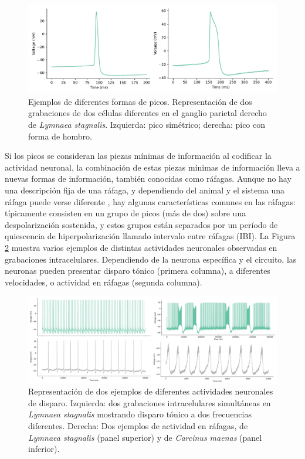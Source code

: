 \begin{figure}[htb!]
	\centering
	\includegraphics[width=\linewidth]{img/intro/spike-types.pdf}
	\caption{Ejemplos de diferentes formas de picos. Representación de dos grabaciones de dos células diferentes en el ganglio parietal derecho de \textit{Lymnaea stagnalis}. Izquierda: pico simétrico; derecha: pico con forma de hombro.}
	\label{fig:spike-types spanish}
\end{figure}

Si los picos se consideran las piezas mínimas de información al codificar la actividad neuronal, la combinación de estas piezas mínimas de información lleva a nuevas formas de información, también conocidas como ráfagas. Aunque no hay una descripción fija de una ráfaga, y dependiendo del animal y el sistema una ráfaga puede verse diferente \parencite{russell_bursting_1978,palmu_detection_2010,lundqvist_gamma_2016}, hay algunas características comunes en las ráfagas: típicamente consisten en un grupo de picos (más de dos) sobre una despolarización sostenida, y estos grupos están separados por un período de quiescencia de hiperpolarización llamado intervalo entre ráfagas (IBI). La Figura \ref{fig:spike_activity-types spanish} muestra varios ejemplos de distintas actividades neuronales observadas en grabaciones intracelulares. Dependiendo de la neurona específica y el circuito, las neuronas pueden presentar disparo tónico (primera columna), a diferentes velocidades, o actividad en ráfagas (segunda columna).

\begin{figure}[htb!]
	\centering
	\includegraphics[width=\linewidth]{img/intro/spike_activity-types.pdf}
	\caption{Representación de dos ejemplos de diferentes actividades neuronales de disparo. Izquierda: dos grabaciones intracelulares simultáneas en \textit{Lymnaea stagnalis} mostrando disparo tónico a dos frecuencias diferentes. Derecha: Dos ejemplos de actividad en ráfagas, de \textit{Lymnaea stagnalis} (panel superior) y de \textit{Carcinus maenas} (panel inferior).}
	\label{fig:spike_activity-types spanish}
\end{figure}

